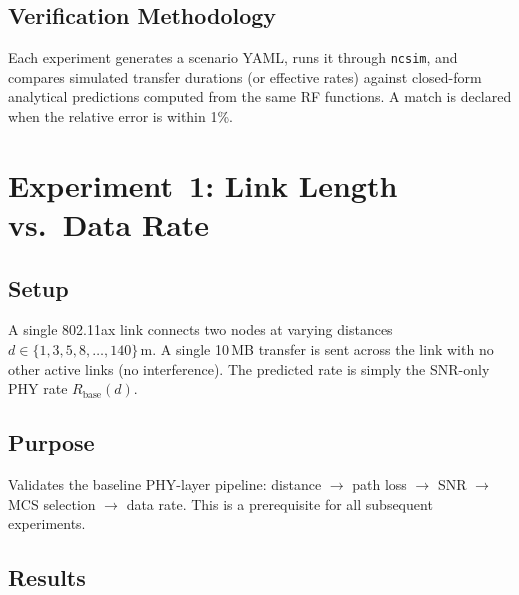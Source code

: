\documentclass[11pt,a4paper]{article}
\newcommand{\ncsim}{\texttt{ncsim}}
\begin{document}
\subsection{Verification Methodology}

Each experiment generates a scenario YAML, runs it through \ncsim{}, and compares simulated transfer durations (or effective rates) against closed-form analytical predictions computed from the same RF functions. A match is declared when the relative error is within 1\%.

\section{Experiment~1: Link Length vs.\ Data Rate}
\label{sec:exp1}

\subsection{Setup}
A single 802.11ax link connects two nodes at varying distances $d \in \{1, 3, 5, 8, \ldots, 140\}\,$m. A single 10\,MB transfer is sent across the link with no other active links (no interference). The predicted rate is simply the SNR-only PHY rate $R_{\text{base}}(d)$.

\subsection{Purpose}
Validates the baseline PHY-layer pipeline: distance $\to$ path loss $\to$ SNR $\to$ MCS selection $\to$ data rate. This is a prerequisite for all subsequent experiments.

\subsection{Results}
\end{document}
